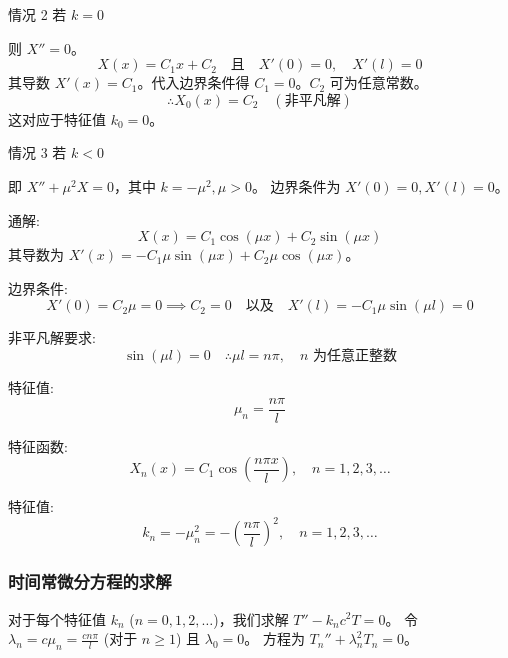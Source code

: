 \documentclass[a4paper, 12pt, oneside]{article} %
\numberwithin{subsection}{section}
\numberwithin{subsubsection}{subsection}
\theoremstyle{plain}
\theoremstyle{definition}
\theoremstyle{remark}
\begin{document}
		情况 2 \quad 若 \(k = 0\)
		
		则 \(X'' = 0\)。
		\begin{equation}
			X(x) = C_1 x + C_2 \quad \text{且} \quad X'(0) = 0, \quad X'(l) = 0
		\end{equation}
		其导数 $X'(x) = C_1$。代入边界条件得 $C_1=0$。$C_2$ 可为任意常数。
		\begin{equation}
			\therefore X_0(x) = C_2 \quad (\text{非平凡解})
		\end{equation}
		这对应于特征值 $k_0=0$。
		
		情况 3 \quad 若 \(k < 0\)
		
		即 \(X'' + \mu^2 X = 0\)，其中 \(k = -\mu^2, \mu > 0\)。
		边界条件为 $X'(0) = 0, X'(l) = 0$。
		
		通解:
		\begin{equation}
			X(x) = C_1 \cos(\mu x) + C_2 \sin(\mu x)
		\end{equation}
		其导数为 $X'(x) = -C_1 \mu \sin(\mu x) + C_2 \mu \cos(\mu x)$。
		
		边界条件:
		\begin{equation}
			X'(0) = C_2 \mu = 0 \implies C_2 = 0 \quad \text{以及} \quad X'(l) = -C_1 \mu \sin(\mu l) = 0
		\end{equation}
		
		非平凡解要求:
		\begin{equation*}
			\sin(\mu l) = 0 \quad \therefore \mu l = n\pi, \quad n \text{ 为任意正整数}
		\end{equation*}
		
		特征值:
		\begin{equation}
			\mu_n = \frac{n\pi}{l}
		\end{equation}
		
		特征函数:
		\begin{equation}
			X_n(x) = C_1 \cos\left(\frac{n\pi x}{l}\right), \quad n = 1, 2, 3, \ldots
		\end{equation}
		
		特征值:
		\begin{equation}
			k_n = -\mu_n^2 = -\left(\frac{n\pi}{l}\right)^2, \quad n = 1, 2, 3, \ldots
		\end{equation}
		
		\subsubsection{时间常微分方程的求解}
		对于每个特征值 $k_n$ ($n=0, 1, 2, \ldots$)，我们求解 $T'' - k_n c^2 T = 0$。
		令 $\lambda_n = c \mu_n = \frac{cn\pi}{l}$ (对于 $n \ge 1$) 且 $\lambda_0 = 0$。
		方程为 $T_n'' + \lambda_n^2 T_n = 0$。
		
\end{document}
